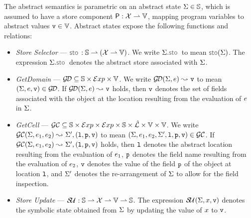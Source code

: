 The abstract semantics is parametric on an abstract state $\Sigma \in \mathbb{S}$, which is assumed to 
have a store component ${\sf P}: \mathcal{X} \rightharpoonup \mathbb{V}$, mapping program variables to abstract 
values $\mathtt{v} \in \mathbb{V}$. Abstract states expose the following functions and relations: 
\begin{itemize}
  \item \emph{Store Selector} --- $\stosel : \absstates \partialmap (\jvars \partialmap \absvals)$. 
           We write $\absstate.\stosel$ to mean $\stosel\!(\absstate)$. 
           The expression $\absstate.\stosel$ denotes the abstract store associated with $\Sigma$. 
             
  \item \emph{GetDomain} --- $\mathcal{G\!D} \subseteq \mathbb{S} \times \mathcal{E}xp \times \mathbb{V}$. 
           We write $\mathcal{G\!D}(\Sigma, e) \leadsto_{} \mathtt{v}$ to mean $(\Sigma, e, \mathtt{v}) \in \mathcal{G\!D}$. 
           If $\mathcal{G\!D}(\Sigma, e) \leadsto_{} \mathtt{v}$ holds, then $\mathtt{v}$ denotes the 
           set of fields associated with the object at the location resulting from the evaluation of $e$ 
           in $\Sigma$. 
  
  \item \emph{GetCell} ---  $\mathcal{GC} \subseteq \mathbb{S} \times \mathcal{E}xp \times \mathcal{E}xp \times \mathbb{S} \times \hat{\mathcal{L}} \times \mathbb{V} \times \mathbb{V}$. 
          We write $\mathcal{GC}(\Sigma, e_1, e_2) \leadsto_{} \Sigma', (\mathtt{l}, \mathtt{p}, \mathtt{v})$ to mean 
           $(\Sigma, e_1, e_2, \Sigma', \mathtt{l}, \mathtt{p}, \mathtt{v}) \in \mathcal{GC}$. 
          If $\mathcal{GC}(\Sigma, e_1, e_2) \leadsto_{} \Sigma', (\mathtt{l}, \mathtt{p}, \mathtt{v})$ holds, 
          then  $\mathtt{l}$ denotes the abstract location resulting from the evaluation of $e_1$, 
           $\mathtt{p}$ denotes the field name resulting from the evaluation of $e_2$, 
           $\mathtt{v}$ denotes the value of the field $\mathtt{p}$ of the object at location $\mathtt{l}$, 
          and  $\Sigma'$ denotes the re-arrangement of $\Sigma$ to allow for the field inspection. 
          
   \item \emph{Store Update} --- $\mathcal{S\!U}_{} : \mathbb{S} \rightharpoonup \mathcal{X} \rightharpoonup \mathbb{V} \rightharpoonup \mathbb{S}$. 
             The expression $\mathcal{S\!U}_{}(\Sigma, x, \mathtt{v})$ denotes the symbolic state obtained from $\Sigma$ 
             by  updating the value of $x$ to $\mathtt{v}$. 
             

\end{itemize}
